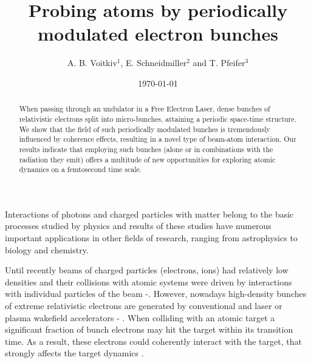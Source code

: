 \documentclass[prl, twocolumn, floatfix]{revtex4}
\begin{document}
\title{ Probing atoms by periodically modulated electron bunches }

\author{ A. B. Voitkiv$^1$, E. Schneidmiller$^2$ and T. Pfeifer$^3$}

\date{\today}

\begin{abstract}
When passing through an undulator in a Free Electron Laser,
dense bunches of relativistic electrons split into micro-bunches,
attaining a periodic space-time structure.
We show that the field of such periodically modulated bunches
is tremendously influenced by
coherence effects, resulting in a novel type of beam-atom interaction.
Our results indicate that employing such bunches
(alone or in combinations with the radiation they emit)
offers a multitude of new opportunities for exploring
atomic dynamics on a femtosecond time scale.
\end{abstract}


\maketitle

Interactions of photons and charged particles
with matter belong to the basic processes studied by
physics and results of these studies have numerous important
applications in other fields of research,
ranging from astrophysics to biology and chemistry.

Until recently beams of charged particles (electrons, ions) had relatively low densities
and their collisions with atomic systems were driven by interactions
with individual particles of the beam \cite{Weigold}-\cite{abv_review}.
However, nowadays high-density bunches of extreme
relativistic electrons are generated by conventional
and laser or plasma wakefield
accelerators \cite{linac} - \cite{PWFA2}.
When colliding with an atomic target
a significant fraction of bunch electrons may
hit the target within its transition time.
As a result, these electrons could coherently interact
with the target, that strongly affects the target dynamics \cite{we-2025}.
\end{document}
